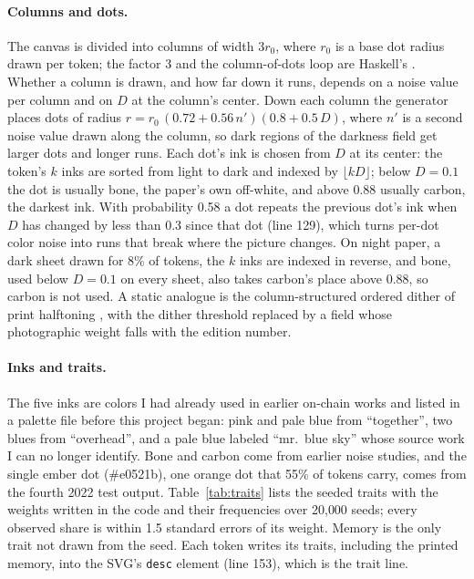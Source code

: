 \documentclass[11pt]{article}
\begin{document}
\paragraph{Columns and dots.} The canvas is divided into columns of width $3r_0$, where $r_0$ is a base dot radius drawn per token; the factor 3 and the column-of-dots loop are Haskell's \citep{haskell2022}. Whether a column is drawn, and how far down it runs, depends on a noise value per column and on $D$ at the column's center. Down each column the generator places dots of radius $r = r_0\,(0.72 + 0.56\,n')(0.8 + 0.5\,D)$, where $n'$ is a second noise value drawn along the column, so dark regions of the darkness field get larger dots and longer runs. Each dot's ink is chosen from $D$ at its center: the token's $k$ inks are sorted from light to dark and indexed by $\lfloor kD \rfloor$; below $D = 0.1$ the dot is usually bone, the paper's own off-white, and above $0.88$ usually carbon, the darkest ink. With probability 0.58 a dot repeats the previous dot's ink when $D$ has changed by less than 0.3 since that dot (line 129), which turns per-dot color noise into runs that break where the picture changes. On night paper, a dark sheet drawn for 8\% of tokens, the $k$ inks are indexed in reverse, and bone, used below $D = 0.1$ on every sheet, also takes carbon's place above $0.88$, so carbon is not used. A static analogue is the column-structured ordered dither of print halftoning \citep{ulichney1987}, with the dither threshold replaced by a field whose photographic weight falls with the edition number.

\paragraph{Inks and traits.} The five inks are colors I had already used in earlier on-chain works and listed in a palette file before this project began: pink and pale blue from ``together'', two blues from ``overhead'', and a pale blue labeled ``mr.\ blue sky'' whose source work I can no longer identify. Bone and carbon come from earlier noise studies, and the single ember dot (\textcolor{ember}{\#e0521b}), one orange dot that 55\% of tokens carry, comes from the fourth 2022 test output. Table~\ref{tab:traits} lists the seeded traits with the weights written in the code and their frequencies over 20{,}000 seeds; every observed share is within 1.5 standard errors of its weight. Memory is the only trait not drawn from the seed. Each token writes its traits, including the printed memory, into the SVG's \texttt{desc} element (line 153), which is the trait line.
\end{document}
